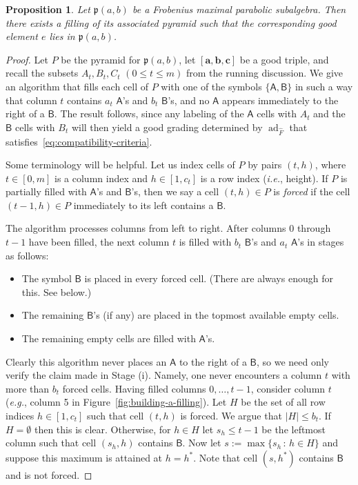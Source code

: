 \documentclass{amsart}
\def\ba{\mathbf{a}}
\def\bb{\mathbf{b}}
\def\bc{\mathbf{c}}
\def\fp{\mathfrak p} %
\def\hatF{\widehat{F}}
\newcommand{\pab}[1][a,b]{\fp(#1)}
\def\ad{\operatorname{ad}}
\newtheorem{proposition}[theorem]{Proposition}
\theoremstyle{definition}
\begin{document}
\begin{proposition}
\label{prop:good-e}
Let $\pab$ be a Frobenius maximal parabolic subalgebra. Then there exists a filling of its associated pyramid such that the corresponding good element $e$ lies in $\pab$.
\end{proposition}

\newcommand{\sfA}{\ensuremath{\mathsf{A}}}
\newcommand{\sfB}{\ensuremath{\mathsf{B}}}

\begin{proof}
Let $P$ be the pyramid for $\pab$, let $[\ba,\bb,\bc]$ be a good triple, and recall the subsets $A_t,B_t,C_t$ $(0\leq t \leq m)$ from the running discussion. We give an algorithm that fills each cell of $P$ with one of the symbols $\{\sfA,\sfB\}$ in such a way that column $t$ contains $a_t$ $\sfA$'s and $b_t$ $\sfB$'s, and no $\sfA$ appears immediately to the right of a $\sfB$. The result  follows, since any labeling of the $\sfA$ cells with $A_t$ and the $\sfB$ cells with $B_t$ will then yield a good grading determined by $\ad_{\hatF}$ that  satisfies~\eqref{eq:compatibility-criteria}.

Some terminology will be helpful. Let us index  cells of $P$ by  pairs $(t,h)$, where $t \in [0,m]$ is a column index and $h \in [1,c_t]$ is a row index ({\it i.e.}, height).  If $P$ is partially filled with $\sfA$'s and $\sfB$'s, then we say a cell $(t,h) \in P$ is \emph{forced} if the cell $(t-1,h) \in P$ immediately to its left contains a $\sfB$.

The algorithm processes columns  from left to right.  After columns $0$ through $t-1$ have been filled, the next column $t$ is filled with $b_t$ $\sfB$'s and $a_t$ $\sfA$'s in stages as follows:  
\begin{itemize}
\item[(i)]    
The symbol $\sfB$ is placed in every forced cell. (There are always enough for this. See below.)
\item[(ii)] The remaining $\sfB$'s (if any) are placed in the topmost available empty cells. 
\item[(iii)] The remaining empty cells are filled with $\sfA$'s.
\end{itemize} 
Clearly this algorithm never places an $\sfA$ to the right of a $\sfB$, so we need only verify the claim made in Stage (i). Namely, one never encounters a column $t$ with more than $b_t$ forced cells.
Having filled columns $0,\ldots,t-1$, consider column $t$ ({\it e.g.}, column 5 in Figure~\ref{fig:building-a-filling}).
Let $H$ be the set of all row indices $h \in [1,c_{t}]$ such that cell $(t,h)$ is forced. 
We argue that $|H| \leq b_t$.  If $H=\emptyset$ then this is clear. Otherwise,
for  $h \in H$ let $s_h \leq t-1$ be the leftmost column such that cell $(s_h, h)$ contains $\sfB$.   Now let  $s := \max\{s_h \,:\, h \in H\}$ and suppose this maximum is attained at $h=h^*$. 
Note that cell $(s,h^*)$ contains $\sfB$ and is not forced. 


\end{proof}
\end{document}
